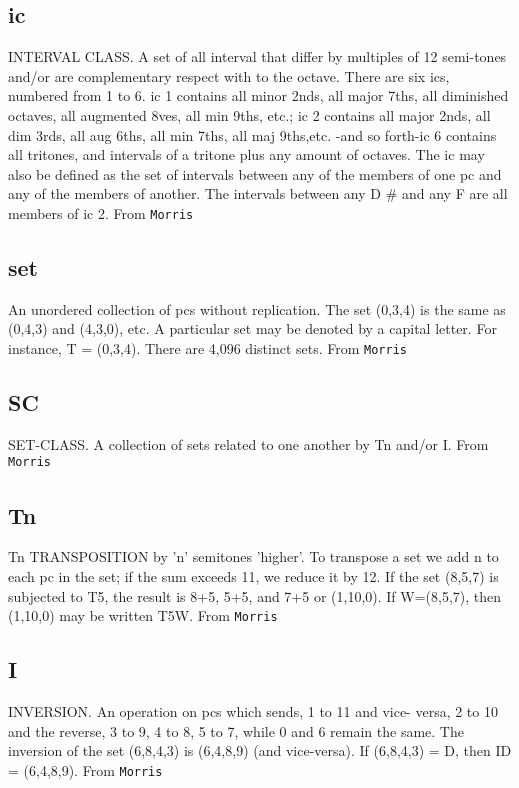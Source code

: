\documentclass[11pt]{article}
\begin{document}
{{\subsection{ic}
\label{sec-21-2}
INTERVAL CLASS. A set of all interval that differ by multiples of 12
semi-tones and/or are complementary respect with to the octave. There
are six ics, numbered from 1 to 6. ic 1 contains all minor 2nds, all
major 7ths, all diminished octaves, all augmented 8ves, all min 9ths,
etc.; ic 2 contains all major 2nds, all dim 3rds, all aug 6ths, all
min 7ths, all maj 9ths,etc. -and so forth-ic 6 contains all tritones,
and intervals of a tritone plus any amount of octaves. The ic may also
be defined as the set of intervals between any of the members of one
pc and any of the members of another. The intervals between any D \#
and any F are all members of ic 2.  From \texttt{Morris}

\subsection{set}
\label{sec-21-3}
An unordered collection of pcs without replication. The set (0,3,4) is
the same as (0,4,3) and (4,3,0), etc. A particular set may be denoted
by a capital letter. For instance, T = (0,3,4). There are 4,096
distinct sets.  From \texttt{Morris}

\subsection{SC}
\label{sec-21-4}
SET-CLASS. A collection of sets related to one another by Tn and/or I.
From \texttt{Morris}

\subsection{Tn}
\label{sec-21-5}
Tn TRANSPOSITION by 'n' semitones 'higher'. To transpose a set we add
n to each pc in the set; if the sum exceeds 11, we reduce it by 12. If
the set (8,5,7) is subjected to T5, the result is 8+5, 5+5, and 7+5 or
(1,10,0). If W=(8,5,7), then (1,10,0) may be written T5W.  From \texttt{Morris}

\subsection{I}
\label{sec-21-6}
INVERSION. An operation on pcs which sends, 1 to 11 and vice- versa, 2
to 10 and the reverse, 3 to 9, 4 to 8, 5 to 7, while 0 and 6 remain
the same. The inversion of the set (6,8,4,3) is (6,4,8,9) (and
vice-versa). If (6,8,4,3) = D, then ID = (6,4,8,9).  From \texttt{Morris}

}}
\end{document}
